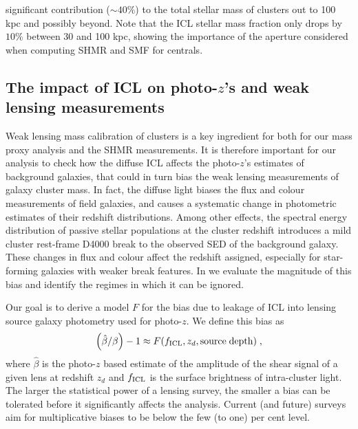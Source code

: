 {significant contribution ($\sim 40\%$) to the total stellar mass of clusters out to 100 kpc and possibly beyond. Note that the ICL stellar mass fraction only drops by $10\%$ between 30 and 100 kpc, showing the importance of the aperture considered when computing SHMR and SMF for centrals.


\subsection{The impact of ICL on photo-$z$'s and weak lensing measurements}

Weak lensing mass calibration of clusters is a key ingredient for both for our mass proxy analysis and the SHMR measurements. It is therefore important for our analysis to check how the diffuse ICL affects the photo-$z$'s estimates of background galaxies, that could in turn bias the weak lensing measurements of galaxy cluster mass. In fact, the diffuse light biases the flux and colour measurements of field galaxies, and causes a systematic change in photometric estimates of their redshift distributions. Among other effects, the spectral energy distribution of passive stellar populations at the cluster redshift introduces a mild cluster rest-frame D4000 break to the observed SED of the background galaxy. These changes in flux and colour affect the redshift assigned, especially for star-forming galaxies with weaker break features. In \citet{gruenicl} we evaluate the magnitude of this bias and identify the regimes in which it can be ignored.

Our goal is to derive a model $F$ for the bias due to leakage of ICL into lensing source galaxy photometry used for photo-$z$. We define this bias as 
\begin{equation}
\left(\hat{\beta}/\beta\right)-1\approx F(f_{\rm ICL}, z_{d},\mathrm{source\;depth}) \; ,
\label{eqn:dbdf}
\end{equation}
where $\hat{\beta}$ is the photo-$z$ based estimate of the amplitude of the shear signal of a given lens at redshift $z_d$ and $f_{\rm ICL}$ is the surface brightness of intra-cluster light. The larger the statistical power of a lensing survey, the smaller a bias can be tolerated before it significantly affects the analysis. Current (and future) surveys aim for multiplicative biases to be below the few (to one) per cent level.

}
